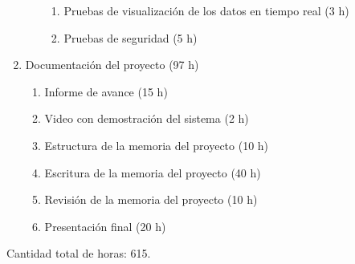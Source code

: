 \begin{enumerate}
\begin{enumerate}
\begin{enumerate}
			            \item Pruebas de visualización de los datos en tiempo real (3 h)
			            \item Pruebas de seguridad (5 h)
		            \end{enumerate}
	      \end{enumerate}
	\item Documentación del proyecto (97 h)
	      \begin{enumerate}
		      \item Informe de avance (15 h)
		      \item Video con demostración del sistema (2 h)
		      \item Estructura de la memoria del proyecto (10 h)
		      \item Escritura de la memoria del proyecto (40 h)
		      \item Revisión de la memoria del proyecto (10 h)
		      \item Presentación final (20 h)
	      \end{enumerate}
\end{enumerate}



Cantidad total de horas: 615.